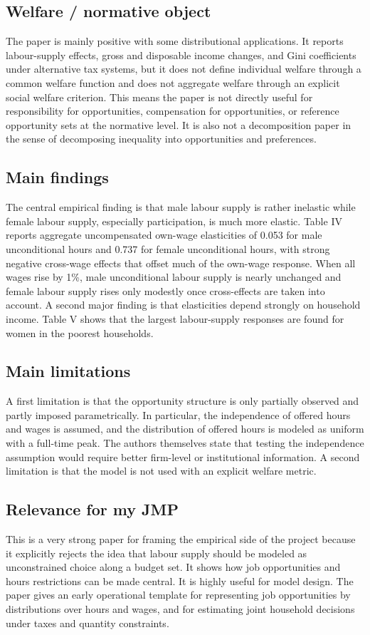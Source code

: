 \documentclass[11pt,a4paper]{article}
\begin{document}
\subsection*{Welfare / normative object}
The paper is mainly positive with some distributional applications. It reports labour-supply effects, gross and disposable income changes, and Gini coefficients under alternative tax systems, but it does not define individual welfare through a common welfare function and does not aggregate welfare through an explicit social welfare criterion. This means the paper is not directly useful for responsibility for opportunities, compensation for opportunities, or reference opportunity sets at the normative level. It is also not a decomposition paper in the sense of decomposing inequality into opportunities and preferences.

\subsection*{Main findings}
The central empirical finding is that male labour supply is rather inelastic while female labour supply, especially participation, is much more elastic. Table IV reports aggregate uncompensated own-wage elasticities of 0.053 for male unconditional hours and 0.737 for female unconditional hours, with strong negative cross-wage effects that offset much of the own-wage response. When all wages rise by 1\%, male unconditional labour supply is nearly unchanged and female labour supply rises only modestly once cross-effects are taken into account. A second major finding is that elasticities depend strongly on household income. Table V shows that the largest labour-supply responses are found for women in the poorest households.

\subsection*{Main limitations}
A first limitation is that the opportunity structure is only partially observed and partly imposed parametrically. In particular, the independence of offered hours and wages is assumed, and the distribution of offered hours is modeled as uniform with a full-time peak. The authors themselves state that testing the independence assumption would require better firm-level or institutional information. A second limitation is that the model is not used with an explicit welfare metric.

\subsection*{Relevance for my JMP}
This is a very strong paper for framing the empirical side of the project because it explicitly rejects the idea that labour supply should be modeled as unconstrained choice along a budget set. It shows how job opportunities and hours restrictions can be made central. It is highly useful for model design. The paper gives an early operational template for representing job opportunities by distributions over hours and wages, and for estimating joint household decisions under taxes and quantity constraints.
\end{document}
